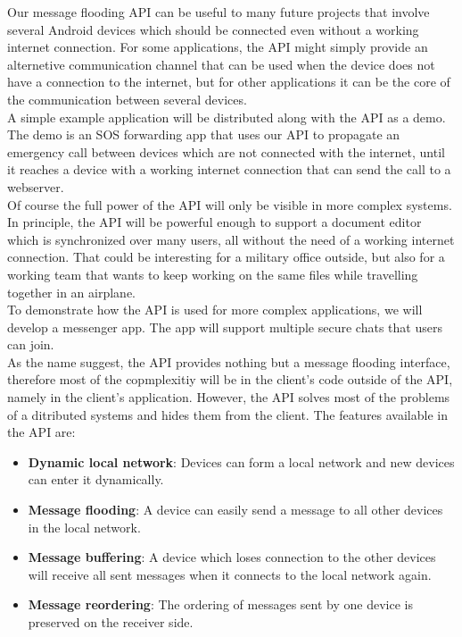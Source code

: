 Our message flooding API can be useful to many future projects that involve several Android devices which should be connected even without a working internet connection. For some applications, the API might simply provide an alternetive communication channel that can be used when the device does not have a connection to the internet, but for other applications it can be the core of the communication between several devices. \\
		A simple example application will be distributed along with the API as a demo. The demo is an SOS forwarding app that uses our API to propagate an emergency call between devices which are not connected with the internet, until it reaches a device with a working internet connection that can send the call to a webserver. \\
		Of course the full power of the API will only be visible in more complex systems. In principle, the API will be powerful enough to support a document editor which is synchronized over many users, all without the need of a working internet connection. That could be interesting for a military office outside, but also for a working team that wants to keep working on the same files while travelling together in an airplane. \\
		To demonstrate how the API is used for more complex applications, we will develop a messenger app. The app will support multiple secure chats that users can join. \\
		As the name suggest, the API provides nothing but a message flooding interface, therefore most of the copmplexitiy will be in the client's code outside of the API, namely in the client's application. However, the API solves most of the problems of a ditributed systems and hides them from the client. The features available in the API are:
		\begin{itemize}
        	\item {\bf Dynamic local network}: Devices can form a local network and new devices can enter it dynamically.
        	\item {\bf Message flooding}: A device can easily send a message to all other devices in the local network.
        	\item {\bf Message buffering}: A device which loses connection to the other devices will receive all sent messages when it connects to the local network again.
        	\item {\bf Message reordering}: The ordering of messages sent by one device is preserved on the receiver side.
		\end{itemize}
